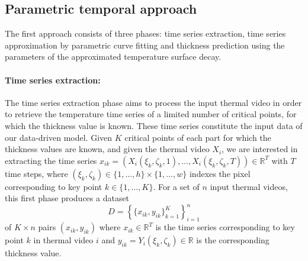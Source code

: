 \subsection{Parametric temporal approach} \label{Parametric Temporal approach}

The first approach consists of three phases: time series extraction, time series approximation by parametric curve fitting and thickness prediction using the parameters of the approximated temperature surface decay.

\paragraph{Time series extraction:} 

The time series extraction phase aims to process the input thermal video in order to retrieve the temperature time series of a limited number of critical points, for which the thickness value is known. These time series constitute the input data of our data-driven model.
Given $K$ critical points of each part for which the thickness values are known, and given the thermal video $X_{i}$, we are interested in extracting the time series ${x}_{ik} = \left (X_{i}(\xi_{k}, \zeta_{k},1),\ldots,X_{i}(\xi_{k}, \zeta_{k},T) \right) \in \mathds{R}^{T}$ with $T$ time steps, where $(\xi_{k}, \zeta_{k}) \in \{1,\ldots,h\}\times\{1,\ldots,w\}$ indexes the pixel corresponding to key point $k \in \{1,\ldots,K\}$. For a set of $n$ input thermal videos, this first phase produces a dataset
\begin{equation}
    D = \left\{\{x_{ik},y_{ik}\}_{k=1}^K\right\}_{i=1}^n
\end{equation}
of $K \times n$ pairs $(x_{ik},y_{ik})$ where $x_{ik} \in \mathds{R}^{T}$ is the time series corresponding to key point $k$ in thermal video $i$ and $y_{ik} = Y_{i}(\xi_{k}, \zeta_{k}) \in \mathds{R}$ is the corresponding thickness value.


